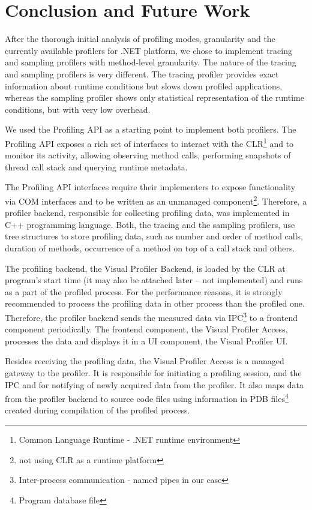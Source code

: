 \chapter{Conclusion and Future Work}

After the thorough initial analysis of profiling modes, granularity and the currently available profilers for .NET platform, we chose to implement tracing and sampling profilers with method-level granularity. The nature of the tracing and sampling profilers is very different. The tracing profiler provides exact information about runtime conditions but slows down profiled applications, whereas the sampling profiler shows only statistical representation of the runtime conditions, but with very low overhead.

We used the Profiling API as a starting point to implement both profilers. The Profiling API exposes a rich set of interfaces to interact with the CLR\footnote{Common Language Runtime - .NET runtime environment} and to monitor its activity, allowing observing method calls, performing snapshots of thread call stack and querying runtime metadata.

The Profiling API interfaces require their implementers to expose functionality via COM interfaces and to be written as an unmanaged component\footnote{not using CLR as a runtime platform}. Therefore, a profiler backend, responsible for collecting profiling data, was implemented in C++ programming language. Both, the tracing and the sampling profilers, use tree structures to store profiling data, such as number and order of method calls, duration of methods, occurrence of a method on top of a call stack and others.

The profiling backend, the Visual Profiler Backend, is loaded by the CLR at program's start time (it may also be attached later -- not implemented) and runs as a part of the profiled process. For the performance reasons, it is strongly recommended to process the profiling data in other process than the profiled one. Therefore, the profiler backend sends the measured data via IPC\footnote{Inter-process communication - named pipes in our case}  to a frontend component periodically. The frontend component, the Visual Profiler Access, processes the data and displays it in a UI component, the Visual Profiler UI. 

Besides receiving the profiling data, the Visual Profiler Access is a managed gateway to the profiler. It is responsible for initiating a profiling session, and the IPC and for notifying of newly acquired data from the profiler. It also maps data from the profiler backend to source code files using information in PDB files\footnote{Program database file} created during compilation of the profiled process.

